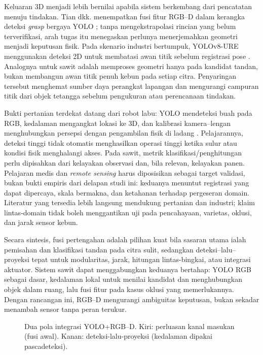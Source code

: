 Keluaran 3D menjadi lebih bernilai apabila sistem berkembang dari pencatatan menuju tindakan. Tian dkk. menempatkan fusi fitur RGB--D dalam kerangka deteksi \textit{grasp} bergaya YOLO \cite{tian2023grasp}; tanpa mengekstrapolasi rincian yang belum terverifikasi, arah tugas itu menegaskan perlunya menerjemahkan geometri menjadi keputusan fisik. Pada skenario industri bertumpuk, YOLOv8-URE menggunakan deteksi 2D untuk membatasi awan titik sebelum registrasi pose \cite{yang2025yolov8ure}. Analognya untuk sawit adalah memproses geometri hanya pada kandidat tandan, bukan membangun awan titik penuh kebun pada setiap citra. Penyaringan tersebut menghemat sumber daya perangkat lapangan dan mengurangi campuran titik dari objek tetangga sebelum pengukuran atau perencanaan tindakan.

Bukti pertanian terdekat datang dari robot labu: YOLO mendeteksi buah pada RGB, kedalaman mengangkat lokasi ke 3D, dan kalibrasi kamera--lengan menghubungkan persepsi dengan pengambilan fisik di ladang \cite{ito2024pumpkin}. Pelajarannya, deteksi tinggi tidak otomatis menghasilkan operasi tinggi ketika sulur atau kondisi fisik menghalangi akses. Pada sawit, metrik klasifikasi/penghitungan perlu dipisahkan dari kelayakan observasi dan, bila relevan, kelayakan panen. Pelajaran medis dan \textit{remote sensing} harus diposisikan sebagai target validasi, bukan bukti empiris dari delapan studi ini: keduanya menuntut registrasi yang dapat dipercaya, skala bermakna, dan ketahanan terhadap pergeseran domain. Literatur yang tersedia lebih langsung mendukung pertanian dan industri; klaim lintas-domain tidak boleh menggantikan uji pada pencahayaan, varietas, oklusi, dan jarak sensor kebun.

Secara sintesis, fusi pertengahan adalah pilihan kuat bila sasaran utama ialah pemisahan dan klasifikasi tandan pada citra sulit, sedangkan deteksi--lalu--proyeksi tepat untuk modularitas, jarak, hitungan lintas-bingkai, atau integrasi aktuator. Sistem sawit dapat menggabungkan keduanya bertahap: YOLO RGB sebagai dasar, kedalaman lokal untuk menilai kandidat dan menghubungkan objek dalam ruang, lalu fusi fitur pada kasus oklusi yang memerlukannya. Dengan rancangan ini, RGB--D mengurangi ambiguitas keputusan, bukan sekadar menambah sensor tanpa peran terukur.

\begin{figure}[t]
\centering
{}
\caption{Dua pola integrasi YOLO+RGB--D. Kiri: perluasan kanal masukan
(fusi awal). Kanan: deteksi-lalu-proyeksi (kedalaman dipakai pascadeteksi).}
\label{fig:yolorgbd}
\end{figure}

